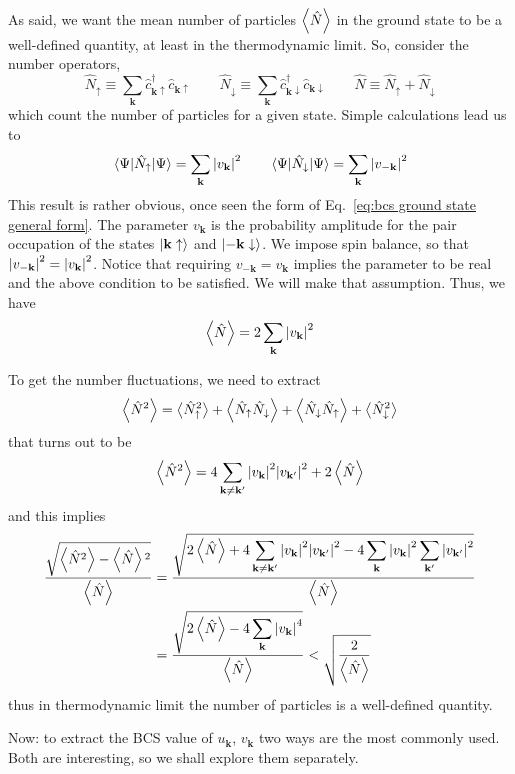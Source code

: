 As said, we want the mean number of particles $\ev{\hat{N}}$ in the ground state to be a well-defined quantity, at least in the thermodynamic limit. So, consider the number operators,
\[
	\hat{N}_\uparrow \equiv \sum_{\mathbf{k}}
		\hat{c}_{\mathbf{k}\uparrow}^\dagger \hat{c}_{\mathbf{k}\uparrow}
	\qquad
	\hat{N}_\downarrow \equiv \sum_{\mathbf{k}}
		\hat{c}_{\mathbf{k}\downarrow}^\dagger \hat{c}_{\mathbf{k}\downarrow}
	\qquad
	\hat{N} \equiv \hat{N}_\uparrow + \hat{N}_\downarrow
\]
which count the number of particles for a given state. Simple calculations lead us to
\[
	\mel{\Psi}{\hat{N}_\uparrow}{\Psi} = \sum_{\mathbf{k}} \abs{v_\mathbf{k}}^2
	\qquad
	\mel{\Psi}{\hat{N}_\downarrow}{\Psi} = \sum_{\mathbf{k}} \abs{v_{-\mathbf{k}}}^2
\]
This result is rather obvious, once seen the form of Eq.~\eqref{eq:bcs ground state general form}. The parameter $v_\mathbf{k}$ is the probability amplitude for the pair occupation of the states $\ket{\mathbf{k}\uparrow}$ and $\ket{-\mathbf{k}\downarrow}$.
We impose spin balance, so that $\abs{v_{-\mathbf{k}}}^2 = \abs{v_\mathbf{k}}^2$. Notice that requiring $v_{-\mathbf{k}} = v_\mathbf{k}$ implies the parameter to be real and the above condition to be satisfied. We will make that assumption. Thus, we have
\[
	\ev{\hat{N}} = 2\sum_{\mathbf{k}} \abs{v_\mathbf{k}}^2
\]

To get the number fluctuations, we need to extract
\[
	\ev{\hat{N}^2} = \big\langle \hat{N}_\uparrow^2 \big\rangle + \ev{\hat{N}_\uparrow \hat{N}_\downarrow} + \ev{\hat{N}_\downarrow \hat{N}_\uparrow} + \big\langle \hat{N}_\downarrow^2 \big\rangle
\]
that turns out to be
\[
	\ev{\hat{N}^2} = 4 \sum_{\mathbf{k} \neq \mathbf{k}'} \abs{v_\mathbf{k}}^2 \abs{v_{\mathbf{k}'}}^2 + 2 \ev{\hat{N}}
\]
and this implies
\[
\begin{aligned}
	\frac{\sqrt{\ev{\hat{N}^2} - \ev{\hat{N}} \vphantom{\hat{N}}^2}}{\ev{\hat{N}}} &= \frac{\displaystyle
		\sqrt{2\ev{\hat{N}} + 4\sum_{\mathbf{k}\neq\mathbf{k}'} \abs{v_\mathbf{k}}^2 \abs{v_{\mathbf{k}'}}^2 - 4\sum_{\mathbf{k}} \abs{v_\mathbf{k}}^2 \sum_{\mathbf{k}'} \abs{v_{\mathbf{k}'}}^2}
	}{ \ev{\hat{N}}	} \\
	&= \frac{\displaystyle
		\sqrt{2\ev{\hat{N}} - 4\sum_\mathbf{k} \abs{v_\mathbf{k}}^4}
	}{ \ev{\hat{N}}	} < \sqrt{\frac{2}{\ev{\hat{N}}}}
\end{aligned}
\]
thus in thermodynamic limit the number of particles is a well-defined quantity.


Now: to extract the BCS value of $u_\mathbf{k}$, $v_\mathbf{k}$ two ways are the most commonly used. Both are interesting, so we shall explore them separately.

